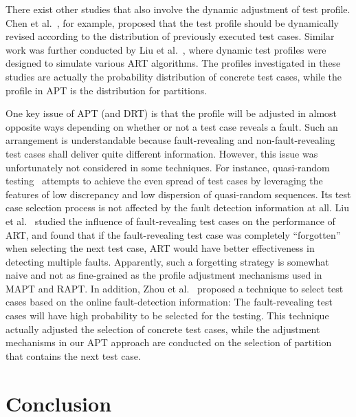 \documentclass[10pt,journal,compsoc]{IEEEtran}
\begin{document}
There exist other studies that also involve the dynamic adjustment of test profile. Chen et al.~\cite{Chen09}, for example, proposed that the test profile should be dynamically revised according to the distribution of previously executed test cases. Similar work was further conducted by Liu et al.~\cite{Liu11}, where dynamic test profiles were designed to simulate various ART algorithms. The profiles investigated in these studies are actually the probability distribution of concrete test cases, while the profile in APT is the distribution for partitions.

One key issue of APT (and DRT) is that the profile will be adjusted in almost opposite ways depending on whether or not a test case reveals a fault. Such an arrangement is understandable because fault-revealing and non-fault-revealing test cases shall deliver quite different information. However, this issue was unfortunately not considered in some techniques. For instance, quasi-random testing~\cite{Chen07, Liu16} attempts to achieve the even spread of test cases by leveraging the features of low discrepancy and low dispersion of quasi-random sequences. Its test case selection process is not affected by the fault detection information at all. Liu et al.~\cite{Liu12} studied the influence of fault-revealing test cases on the performance of ART, and found that if the fault-revealing test case was completely ``forgotten'' when selecting the next test case, ART would have better effectiveness in detecting multiple faults. Apparently, such a forgetting strategy is somewhat naive and not as fine-grained as the profile adjustment mechanisms used in MAPT and RAPT. In addition, Zhou et al.~\cite{Zhou09} proposed a technique to select test cases based on the online fault-detection information: The fault-revealing test cases will have high probability to be selected for the testing. This technique actually adjusted the selection of concrete test cases, while the adjustment mechanisms in our APT approach are conducted on the selection of partition that contains the next test case.

\section{Conclusion}
\label{sec:conc}
\end{document}
